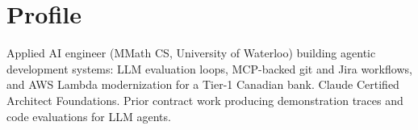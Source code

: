 \section{Profile}

Applied AI engineer (MMath CS, University of Waterloo) building agentic development systems: LLM evaluation loops, MCP-backed git and Jira workflows, and AWS Lambda modernization for a Tier-1 Canadian bank. Claude Certified Architect Foundations. Prior contract work producing demonstration traces and code evaluations for LLM agents.